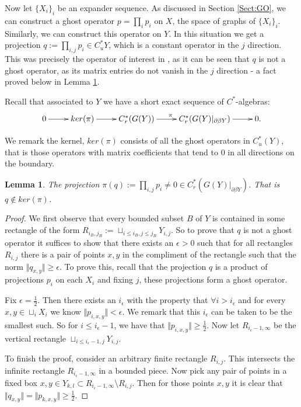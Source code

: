 \documentclass[11pt]{amsart}
\theoremstyle{plain}
\newtheorem{lemma}[theorem]{Lemma}%
\theoremstyle{definition}%
\theoremstyle{remark}%
\begin{document}
Now let $\lbrace X_{i} \rbrace_{i}$ be an expander sequence. As discussed in Section \ref{Sect:GO}, we can construct a ghost operator $p= \prod_{i} p_{i}$ on $X$, the space of graphs of $\lbrace X_{i} \rbrace_{i}$. Similarly, we can construct this operator on $Y$. In this situation we get a projection $q:=\prod_{i,j}p_{i} \in C^{*}_{u}Y$, which is a constant operator in the $j$ direction. This was precisely the operator of interest in \cite{MR2363697}, as it can be seen that $q$ is not a ghost operator, as its matrix entries do not vanish in the $j$ direction - a fact proved below in Lemma \ref{Lem:nag}.

Recall that associated to $Y$ we have a short exact sequence of $C^{*}$-algebras:
\begin{equation*}
\xymatrix{
0 \ar[r] & ker(\pi) \ar[r]& C_{r}^{*}(G(Y)) \ar[r]^{\pi} & C_{r}^{*}(G(Y)|_{\partial\beta Y}) \ar[r] & 0.
}
\end{equation*}

We remark the kernel, $ker(\pi)$ consists of all the ghost operators in $C^{*}_{u}(Y)$, that is those operators with matrix coefficients that tend to $0$ in all directions on the boundary. 

\begin{lemma}\label{Lem:nag}
The projection $\pi(q):= \prod_{i,j}p_{i} \not = 0 \in C^{*}_{r}(G(Y)|_{\partial\beta Y})$. That is $q \not\in ker(\pi)$.
\end{lemma}
\begin{proof}
We first observe that every bounded subset $B$ of $Y$ is contained in some rectangle of the form $R_{i_{B},j_{B}}:=\sqcup_{i\leq i_{B},j\leq j_{B}}Y_{i,j}$. So to prove that $q$ is not a ghost operator it suffices to show that there exists an $\epsilon>0$ such that for all rectangles $R_{i,j}$ there is a pair of points $x,y$ in the compliment of the rectangle such that  the norm $\Vert q_{x,y} \Vert \geq \epsilon$. To prove this, recall that the projection $q$ is a product of projections $p_{i}$ on each $X_{i}$ and fixing $j$, these projections form a ghost operator. 

Fix $\epsilon = \frac{1}{2}$. Then there exists an $i_{\epsilon}$ with the property that $\forall i>i_{\epsilon}$ and for every $x,y \in \sqcup_{i}X_{i}$ we know $\Vert p_{i,x,y} \Vert < \epsilon$. We remark that this $i_{\epsilon}$ can be taken to be the smallest such. So for $i \leq i_{\epsilon}-1$, we have that $\Vert p_{i,x,y} \Vert \geq \frac{1}{2}$. Now let $R_{i_{\epsilon}-1,\infty}$ be the vertical rectangle $\sqcup_{i\leq i_{\epsilon}-1,j} Y_{i,j}$. 

To finish the proof, consider an arbitrary finite rectangle $R_{i,j}$. This intersects the infinite rectangle $R_{i_{\epsilon}-1,\infty}$ in a bounded piece. Now pick any pair of points in a fixed box $x,y \in Y_{k,l} \subset R_{i_{\epsilon}-1,\infty} \setminus R_{i,j}$. Then for those points $x,y$ it is clear that $\Vert q_{x,y} \Vert = \Vert p_{k,x,y}\Vert \geq \frac{1}{2}$.
\end{proof}
\end{document}
